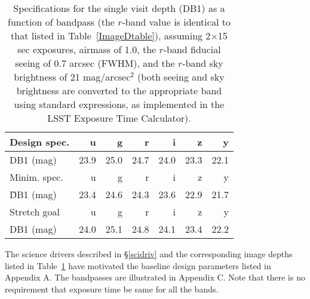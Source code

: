 \begin{table}[h]
\begin{tabular}{|l|r|r|r|r|r|r|}
\hline
 Design spec.  &       u   &     g    &      r     &   i   &   z   &  y   \\
\hline
 DB1 (mag)  &    23.9   &    25.0  &     24.7   &  24.0 &  23.3 & 22.1 \\
\hline
\hline
 Minim. spec.  &       u   &     g    &      r     &   i   &   z   &  y   \\
\hline
\G{DB1 (mag)}  &    23.4   &    24.6  &     24.3   &  23.6 &  22.9 & 21.7 \\
\hline
\hline
 Stretch goal  &       u   &     g    &      r     &   i   &   z   &  y   \\
\hline
 DB1 (mag)     &    24.0   &    25.1  &     24.8   &  24.1 &  23.4 & 22.2 \\
\hline
\end{tabular}
\caption{Specifications for the single visit depth (DB1) as a function
of bandpass (the $r$-band value is identical to that listed in
Table~\ref{ImageDtable}), assuming 2$\times$15 sec exposures,
airmass of 1.0, the $r$-band fiducial seeing of 0.7 arcsec (FWHM), and
the $r$-band sky brightness  of 21 mag/arcsec$^2$
(both seeing and sky brightness are converted to the appropriate band using standard
expressions,  as implemented in the LSST Exposure Time
Calculator). }
\label{ImageDBtable}
\end{table}

The science drivers described in \S \ref{scidriv} and
the corresponding image depths listed in Table~\ref{ImageDBtable}
have motivated the baseline design
parameters listed in Appendix A.
The  bandpasses  are illustrated in
Appendix C.  Note that there is no
requirement that exposure time be same for all the bands.


